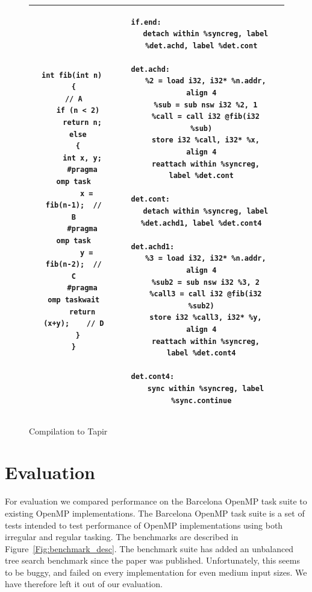 \documentclass[sigconf]{acmart}
\begin{document}
\begin{figure}
\begin{tabular}{| c c c | c c c |}
\hline
 & 
\begin{lstlisting}
int fib(int n) 
{                    // A
  if (n < 2)
    return n;
  else
  {
    int x, y;
    #pragma omp task
      x = fib(n-1);  // B
    #pragma omp task
      y = fib(n-2);  // C
    #pragma omp taskwait
    return (x+y);    // D
  }
}
\end{lstlisting}
& & &
\begin{lstlisting}
if.end:                                 
  detach within %syncreg, label %det.achd, label %det.cont

det.achd:                                 
  %2 = load i32, i32* %n.addr, align 4
  %sub = sub nsw i32 %2, 1
  %call = call i32 @fib(i32 %sub)
  store i32 %call, i32* %x, align 4
  reattach within %syncreg, label %det.cont

det.cont:                                   
  detach within %syncreg, label %det.achd1, label %det.cont4

det.achd1:                                
  %3 = load i32, i32* %n.addr, align 4
  %sub2 = sub nsw i32 %3, 2
  %call3 = call i32 @fib(i32 %sub2)
  store i32 %call3, i32* %y, align 4
  reattach within %syncreg, label %det.cont4

det.cont4:                                  
  sync within %syncreg, label %sync.continue
\end{lstlisting}
 &  \\
\hline
\end{tabular}

\caption{Compilation to Tapir}
\label{Fig:Example}
\end{figure}

\section{Evaluation} \label{Sec:Evaluation}

For evaluation we compared performance on the Barcelona OpenMP task suite to 
existing OpenMP implementations. The Barcelona OpenMP task suite is a set of 
tests intended to test performance of OpenMP implementations using both
irregular and regular tasking. The benchmarks are described in
Figure~\ref{Fig:benchmark_desc}. The benchmark suite has added an unbalanced
tree search benchmark since the paper was published.  Unfortunately, this seems
to be buggy, and failed on every implementation for even medium input sizes. We
have therefore left it out of our evaluation.
\end{document}
